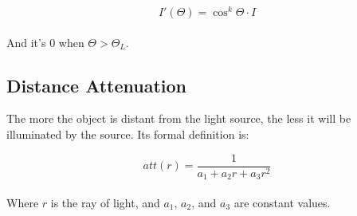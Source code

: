 \documentclass{article}
\begin{document}
\[ I'(\Theta) = \cos^k\Theta \cdot I \] \\
And it's 0 when $\Theta > \Theta_L$.

\subsection{Distance Attenuation}
The more the object is distant from the light source, the less it will be illuminated by the source. Its formal definition is:

\[ att(r) = \frac{1}{a_1 + a_2r + a_3r^2} \] \\
Where $r$ is the ray of light, and $a_1$, $a_2$, and $a_3$ are constant values.
\end{document}
